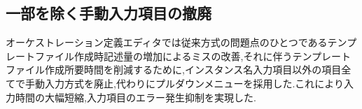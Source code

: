 \documentclass[a4j]{jarticle}
\begin{document}
\begin{Abstract}
 \subsection{一部を除く手動入力項目の撤廃}
 オーケストレーション定義エディタでは従来方式の問題点のひとつであるテンプレートファイル作成時記述量の増加によるミスの改善,それに伴うテンプレートファイル作成所要時間を削減するために,インスタンス名入力項目以外の項目全てで手動入力方式を廃止,代わりにプルダウンメニューを採用した.これにより入力時間の大幅短縮,入力項目のエラー発生抑制を実現した.


\end{Abstract}
\end{document}
